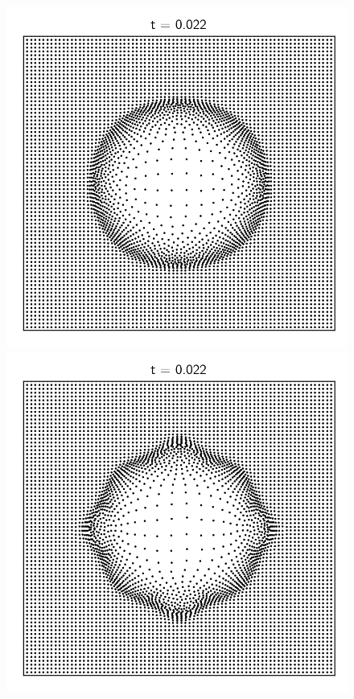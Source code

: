 \begin{figure}
\endminipage\hfill
{}
  \includegraphics[width=\linewidth]{figures/Meshless/positions_sedov_hopkins_uniform.png}
\endminipage\hfill
{}%
  \includegraphics[width=\linewidth]{figures/Meshless/positions_sedov_ivanova_uniform.png}

\end{figure}
